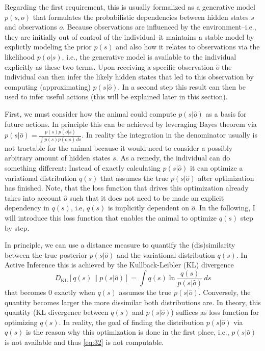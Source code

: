 Regarding the first requirement, this is usually formalized as a generative model \(p(s,o)\) that formulates the probabilistic dependencies between hidden states \(s\) and observations \(o\). Because observations are influenced by the environment--i.e., they are initially out of control of the individual--it maintains a stable model by explictly modeling the prior \(p(s)\) and also how it relates to observations via the likelihood \(p(o|s)\), i.e., the generative model is available to the individual explicitly as these two terms. Upon receiving a specific observation \(\hat o\) the individual can then infer the likely hidden states that led to this observation by computing (approximating) \(p(s|\hat o)\). In a second step this result can then be used to infer useful actions (this will be explained later in this section).

First, we must consider how the animal could compute \(p(s|\hat o)\) as a basis for future actions. In principle this can be achieved by leveraging Bayes theorem via \(p(s|\hat o) = \frac{p(s)p(o|s)}{\int p(s)p(o|s)\,ds}\). In reality the integration in the denominator usually is not tractable for the animal because it would need to consider a possibly arbitrary amount of hidden states \(s\). As a remedy, the individual can do something different: Instead of exactly calculating \(p(s|\hat o)\) it can optimize a variational distribution \(q(s)\) that assumes the true \(p(s|\hat o)\) after optimization has finished. Note, that the loss function that drives this optimization already takes into account \(\hat o\) such that it does not need to be made an explicit dependency in \(q(s)\), i.e, \(q(s)\) is implicitly dependent on \(\hat o\). In the following, I will introduce this loss function that enables the animal to optimize \(q(s)\) step by step.

In principle, we can use a distance measure to quantify the (dis)similarity between the true posterior \(p(s|\hat o)\) and the variational distribution \(q(s)\). In Active Inference this is achieved by the Kullback-Leibler (KL) divergence
\begin{equation}
    D_{\text{KL}}[q(s) \parallel p(s|\hat o)] = \int q(s) \ln \frac{q(s)}{p(s|\hat o)} \, ds
    \label{eq:32}
\end{equation}
that becomes 0 exactly when \(q(s)\) assumes the true \(p(s|\hat o)\). Conversely, the quantity becomes larger the more dissimilar both distributions are. In theory, this quantity (KL divergence between \(q(s)\) and \(p(s|\hat o)\)) suffices as loss function for optimizing \(q(s)\). In reality, the goal of finding the distribution \(p(s|\hat o)\) via \(q(s)\) is the reason why this optimization is done in the first place, i.e., \(p(s|\hat o)\) is not available and thus \cref{eq:32} is not computable.

